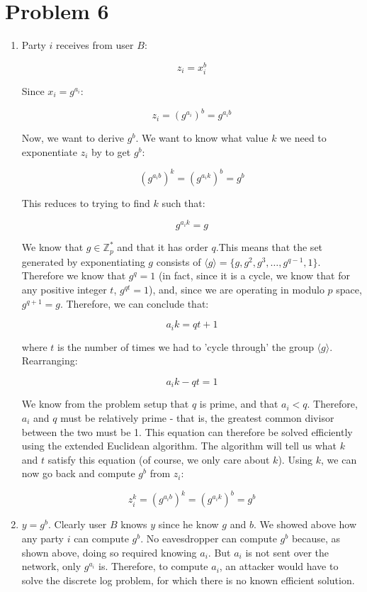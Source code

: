 \documentclass{article}
\begin{document}
\section*{Problem 6}
\begin{enumerate}

\item %
Party $i$ receives from user $B$:

$$z_i = x_i^b$$

Since $x_i = g^{a_i}$:

$$z_i = (g^{a_i})^{b} = g^{a_i b}$$

Now, we want to derive $g^b$. We want to know what value $k$ we need to exponentiate $z_i$ by to get $g^b$:

$$(g^{a_i b})^k = (g^{a_i k})^b = g^b$$

This reduces to trying to find $k$ such that:

$$g^{a_i k} = g$$

 We know that $g \in \mathbb{Z}^*_p$ and that it has order $q$.This means that the set generated by exponentiating $g$ consists of $
\langle g \rangle = \{g, g^2, g^3, \dots, g^{q-1}, 1\}$. Therefore we know that $g^q = 1$ (in fact, since it is a cycle, we know that for any positive integer $t$,  $g^{qt} = 1$), and, since we are operating in modulo $p$ space, $g^{q+1} = g$. Therefore, we can conclude that:
 
 $$a_i k = qt + 1$$
 
 where $t$ is the number of times we had to 'cycle through' the group $\langle g \rangle$. Rearranging:
 
 $$a_i k - qt = 1$$
 
 We know from the problem setup that $q$ is prime, and that $a_i < q$. Therefore, $a_i$ and $q$ must be relatively prime - that is, the greatest common divisor between the two must be 1. This equation can therefore be solved efficiently using the extended Euclidean algorithm. The algorithm will tell us what $k$ and $t$ satisfy this equation (of course, we only care about $k$). Using $k$, we can now go back and compute $g^b$ from $z_i$:
 
 $$z_i^{k} = (g^{a_i b})^k = (g^{a_i k})^b = g^b$$

\item %
$y = g^b$. Clearly user $B$ knows $y$ since he know $g$ and $b$. We showed above how any party $i$ can compute $g^b$. No eavesdropper can compute $g^b$ because, as shown above, doing so required knowing $a_i$. But $a_i$ is not sent over the network, only $g^{a_i}$ is. Therefore, to compute $a_i$, an attacker would have to solve the discrete log problem, for which there is no known efficient solution.


\end{enumerate}
\end{document}
